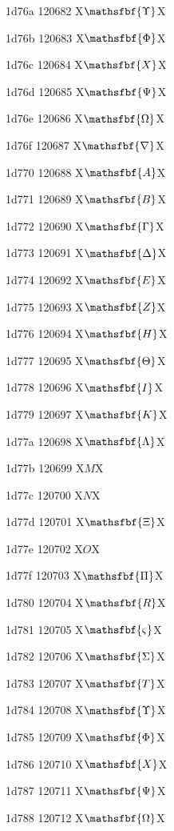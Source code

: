 \documentclass[11pt]{article}
\begin{document}
1d76a 120682 X{\ensuremath{\mathsfbf{\Upsilon}}}X

1d76b 120683 X{\ensuremath{\mathsfbf{\Phi}}}X

1d76c 120684 X{\ensuremath{\mathsfbf{X}}}X

1d76d 120685 X{\ensuremath{\mathsfbf{\Psi}}}X

1d76e 120686 X{\ensuremath{\mathsfbf{\Omega}}}X

1d76f 120687 X{\ensuremath{\mathsfbf{\nabla}}}X

1d770 120688 X{\ensuremath{\mathsfbf{A}}}X

1d771 120689 X{\ensuremath{\mathsfbf{B}}}X

1d772 120690 X{\ensuremath{\mathsfbf{\Gamma}}}X

1d773 120691 X{\ensuremath{\mathsfbf{\Delta}}}X

1d774 120692 X{\ensuremath{\mathsfbf{E}}}X

1d775 120693 X{\ensuremath{\mathsfbf{Z}}}X

1d776 120694 X{\ensuremath{\mathsfbf{H}}}X

1d777 120695 X{\ensuremath{\mathsfbf{\Theta}}}X

1d778 120696 X{\ensuremath{\mathsfbf{I}}}X

1d779 120697 X{\ensuremath{\mathsfbf{K}}}X

1d77a 120698 X{\ensuremath{\mathsfbf{\Lambda}}}X

1d77b 120699 X{\ensuremath{M}}X

1d77c 120700 X{\ensuremath{N}}X

1d77d 120701 X{\ensuremath{\mathsfbf{\Xi}}}X

1d77e 120702 X{\ensuremath{O}}X

1d77f 120703 X{\ensuremath{\mathsfbf{\Pi}}}X

1d780 120704 X{\ensuremath{\mathsfbf{R}}}X

1d781 120705 X{\ensuremath{\mathsfbf{\varsigma}}}X

1d782 120706 X{\ensuremath{\mathsfbf{\Sigma}}}X

1d783 120707 X{\ensuremath{\mathsfbf{T}}}X

1d784 120708 X{\ensuremath{\mathsfbf{\Upsilon}}}X

1d785 120709 X{\ensuremath{\mathsfbf{\Phi}}}X

1d786 120710 X{\ensuremath{\mathsfbf{X}}}X

1d787 120711 X{\ensuremath{\mathsfbf{\Psi}}}X

1d788 120712 X{\ensuremath{\mathsfbf{\Omega}}}X
\end{document}
